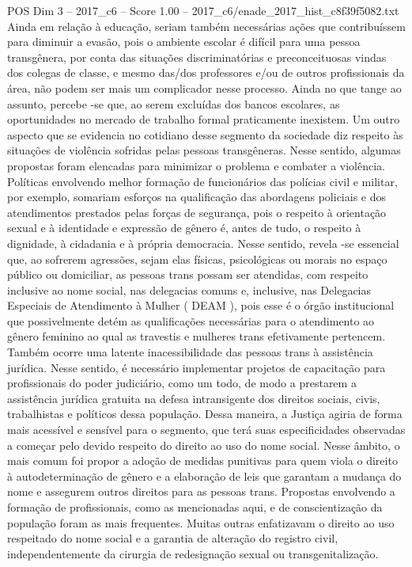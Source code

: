 \begin{textsample}{POS Dim 3 – 2017\_c6 – Score 1.00 – 2017\_c6/enade\_2017\_hist\_c8f39f5082.txt}
Ainda em relação à educação, seriam também necessárias ações que contribuíssem para diminuir a evasão, pois o ambiente escolar é difícil para uma pessoa transgênera, por conta das situações discriminatórias e preconceituosas vindas dos colegas de classe, e mesmo das/dos professores e/ou de outros profissionais da área, não podem ser mais um complicador nesse processo.
Ainda no que tange ao assunto, percebe -se que, ao serem excluídas dos bancos escolares, as oportunidades no mercado de trabalho formal praticamente inexistem.
Um outro aspecto que se evidencia no cotidiano desse segmento da sociedade diz respeito às situações de violência sofridas pelas pessoas transgêneras.
Nesse sentido, algumas propostas foram elencadas para minimizar o problema e combater a violência.
Políticas envolvendo melhor formação de funcionários das polícias civil e militar, por exemplo, somariam esforços na qualificação das abordagens policiais e dos atendimentos prestados pelas forças de segurança, pois o respeito à orientação sexual e à identidade e expressão de gênero é, antes de tudo, o respeito à dignidade, à cidadania e à própria democracia.
Nesse sentido, revela -se essencial que, ao sofrerem agressões, sejam elas físicas, psicológicas ou morais no espaço público ou domiciliar, as pessoas trans possam ser atendidas, com respeito inclusive ao nome social, nas delegacias comuns e, inclusive, nas Delegacias Especiais de Atendimento à Mulher ( DEAM ), pois esse é o órgão institucional que possivelmente detém as qualificações necessárias para o atendimento ao gênero feminino ao qual as travestis e mulheres trans efetivamente pertencem.
Também ocorre uma latente inacessibilidade das pessoas trans à assistência jurídica.
Nesse sentido, é necessário implementar projetos de capacitação para profissionais do poder judiciário, como um todo, de modo a prestarem a assistência jurídica gratuita na defesa intransigente dos direitos sociais, civis, trabalhistas e políticos dessa população.
Dessa maneira, a Justiça agiria de forma mais acessível e sensível para o segmento, que terá suas especificidades observadas a começar pelo devido respeito do direito ao uso do nome social.
Nesse âmbito, o mais comum foi propor a adoção de medidas punitivas para quem viola o direito à autodeterminação de gênero e a elaboração de leis que garantam a mudança do nome e assegurem outros direitos para as pessoas trans.
Propostas envolvendo a formação de profissionais, como as mencionadas aqui, e de conscientização da população foram as mais frequentes.
Muitas outras enfatizavam o direito ao uso respeitado do nome social e a garantia de alteração do registro civil, independentemente da cirurgia de redesignação sexual ou transgenitalização.

\end{textsample}
